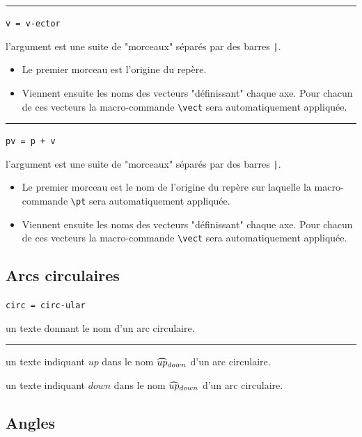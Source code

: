 \documentclass[12pt,a4paper]{book}
\newcommand\env[1]{\texttt{#1}}
\newcommand\macro[1]{\env{\textbackslash{}#1}}
\theoremstyle{definition}
\newcommand\separation{
	\medskip
	\hfill\rule{0.5\textwidth}{0.75pt}\hfill
	\medskip
}
\newcommand\mwhyprefix[2]{%
	\texttt{#1 = #1-#2}%
}
\newcommand\prefix[1]{%
	\texttt{#1}%
}
\begin{document}
{{\separation

 \hfill \mwhyprefix{v}{ector}

\IDarg{} l'argument est une suite de "morceaux" séparés par des barres \verb+|+.

\begin{itemize}[topsep=0pt]
	\item Le premier morceau est l'origine du repère.

	\item Viennent ensuite les noms des vecteurs "définissant" chaque axe. Pour chacun de ces vecteurs la macro-commande \macro{vect} sera automatiquement appliquée.
\end{itemize}


\separation

 \hfill \prefix{pv = p + v}

\IDarg{} l'argument est une suite de "morceaux" séparés par des barres \verb+|+.

\begin{itemize}[topsep=0pt]
	\item Le premier morceau est le nom de l'origine du repère sur laquelle la macro-commande \macro{pt} sera automatiquement appliquée.

	\item Viennent ensuite les noms des vecteurs "définissant" chaque axe. Pour chacun de ces vecteurs la macro-commande \macro{vect} sera automatiquement appliquée.
\end{itemize}


\subsection{Arcs circulaires}



 \hfill \mwhyprefix{circ}{ular}

\IDarg{} un texte donnant le nom d'un arc circulaire.


\separation



 un texte indiquant $up$ dans le nom $\circarc*{up}{down}$ d'un arc circulaire.

 un texte indiquant $down$ dans le nom $\circarc*{up}{down}$ d'un arc circulaire.


\subsection{Angles}

}}
\end{document}
